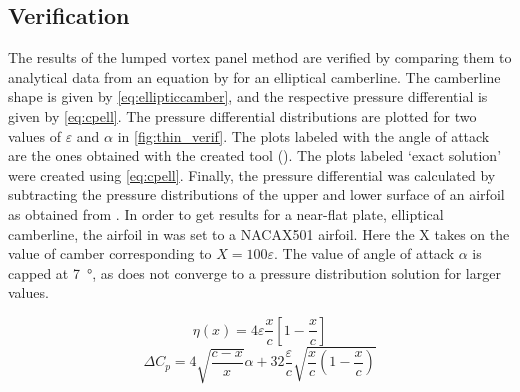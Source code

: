 \subsection{Verification}
The results of the lumped vortex panel method are verified by comparing them to
analytical data from an equation by \citeauthor{katz_plotkin} for an elliptical
camberline. The camberline shape is given by \cref{eq:ellipticcamber}, and the
respective pressure differential is given by \cref{eq:cpell}. The pressure
differential distributions are plotted for two values of $\varepsilon$ and $\alpha$
in \cref{fig:thin_verif}. The plots labeled with the angle of attack are the
ones obtained with the created tool (\numfoil). The plots labeled `exact solution' were
created using \cref{eq:cpell}. Finally, the pressure differential was calculated
by subtracting the pressure distributions of the upper and lower surface of an
airfoil as obtained from \xfoil. In order to get results for a near-flat plate, elliptical
camberline, the airfoil in \xfoil was set to a NACAX501 airfoil. Here the X takes
on the value of camber corresponding to $X = 100\varepsilon$.
The value of angle of attack $\alpha$ is capped at \SI{7}{\degree}, as \xfoil does
not converge to a pressure distribution solution for larger values.

\begin{equation}
  \label{eq:ellipticcamber}
  \eta(x) = 4 \varepsilon \frac{x}{c} \left[ 1 - \frac{x}{c} \right]
\end{equation}
\begin{equation}
  \label{eq:cpell}
  \Delta C_p = 4 \sqrt{\frac{c-x}{x}}\alpha + 32 \frac{\varepsilon}{c}\sqrt{\frac{x}{c}\left( 1- \frac{x}{c}\right)}
\end{equation}
\medskip

